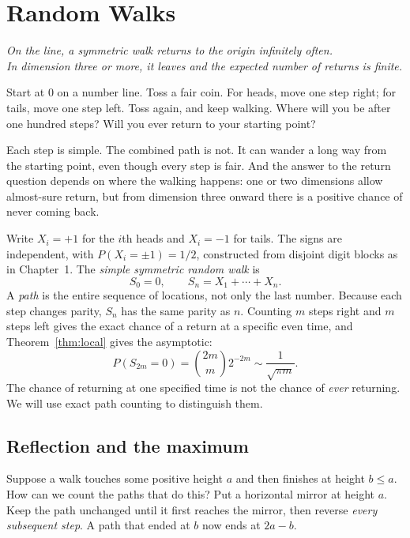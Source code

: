 \chapter{Random Walks}

\begin{center}\itshape
On the line, a symmetric walk returns to the origin infinitely often.\\
In dimension three or more, it leaves and the expected number of returns is finite.
\end{center}

Start at $0$ on a number line. Toss a fair coin. For heads, move one step right; for tails, move one step left. Toss again, and keep walking. Where will you be after one hundred steps? Will you ever return to your starting point?

Each step is simple. The combined path is not. It can wander a long way from the starting point, even though every step is fair. And the answer to the return question depends on where the walking happens: one or two dimensions allow almost-sure return, but from dimension three onward there is a positive chance of never coming back.

Write $X_i=+1$ for the $i$th heads and $X_i=-1$ for tails. The signs are independent, with $P(X_i=\pm1)=1/2$, constructed from disjoint digit blocks as in Chapter~1. The \emph{simple symmetric random walk} is
\[
 S_0=0,\qquad S_n=X_1+\cdots+X_n.
\]
A \emph{path} is the entire sequence of locations, not only the last number. Because each step changes parity, $S_n$ has the same parity as $n$. Counting $m$ steps right and $m$ steps left gives the exact chance of a return at a specific even time, and Theorem~\ref{thm:local} gives the asymptotic:
\[
 P(S_{2m}=0)=\binom{2m}{m}2^{-2m}\sim\frac1{\sqrt{\pi m}}.
\]
The chance of returning at one specified time is not the chance of \emph{ever} returning. We will use exact path counting to distinguish them.

\section{Reflection and the maximum}

Suppose a walk touches some positive height $a$ and then finishes at height $b\le a$. How can we count the paths that do this? Put a horizontal mirror at height $a$. Keep the path unchanged until it first reaches the mirror, then reverse \emph{every subsequent step}. A path that ended at $b$ now ends at $2a-b$.

